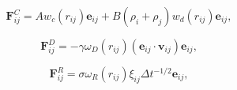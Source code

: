 \documentclass[12pt]{article}
\begin{document}
$$
  \mathbf{F}_{ij}^C = Aw_c(r_{ij})\mathbf{e}_{ij} + B(\rho_i+\rho_j)w_d(r_{ij})\mathbf{e}_{ij},
$$

$$
  \mathbf{F}_{ij}^{D} = -\gamma {\omega_{D}}(r_{ij})(\mathbf{e}_{ij} \cdot \mathbf{v}_{ij})\mathbf{e}_{ij},
$$

$$
  \mathbf{F}_{ij}^{R} = \sigma {\omega_{R}}(r_{ij}){\xi_{ij}}\Delta t^{-1/2} \mathbf{e}_{ij},
$$
\end{document}
